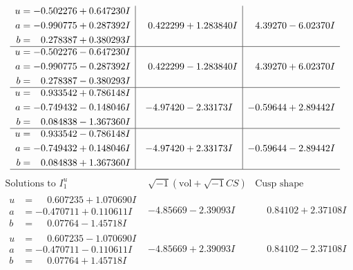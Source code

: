 \documentclass[1p]{elsarticle_modified}
\theoremstyle{definition}
\newcommand{\I}{\sqrt{-1}}
\begin{document}
$$\begin{array}{c|c|c}
\begin{aligned}
u &= -0.502276 + 0.647230 I \\
a &= -0.990775 + 0.287392 I \\
b &= \phantom{-}0.278387 + 0.380293 I\end{aligned}
 & \phantom{-}0.422299 + 1.283840 I & \phantom{-}4.39270 - 6.02370 I \\ \hline\begin{aligned}
u &= -0.502276 - 0.647230 I \\
a &= -0.990775 - 0.287392 I \\
b &= \phantom{-}0.278387 - 0.380293 I\end{aligned}
 & \phantom{-}0.422299 - 1.283840 I & \phantom{-}4.39270 + 6.02370 I \\ \hline\begin{aligned}
u &= \phantom{-}0.933542 + 0.786148 I \\
a &= -0.749432 - 0.148046 I \\
b &= \phantom{-}0.084838 - 1.367360 I\end{aligned}
 & -4.97420 - 2.33173 I & -0.59644 + 2.89442 I \\ \hline\begin{aligned}
u &= \phantom{-}0.933542 - 0.786148 I \\
a &= -0.749432 + 0.148046 I \\
b &= \phantom{-}0.084838 + 1.367360 I\end{aligned}
 & -4.97420 + 2.33173 I & -0.59644 - 2.89442 I\\
 \hline 
 \end{array}$$\newpage$$\begin{array}{c|c|c}  
\text{Solutions to }I^u_{1}& \I (\text{vol} + \sqrt{-1}CS) & \text{Cusp shape}\\
 \hline 
\begin{aligned}
u &= \phantom{-}0.607235 + 1.070690 I \\
a &= -0.470711 + 0.110611 I \\
b &= \phantom{-}0.07764 - 1.45718 I\end{aligned}
 & -4.85669 - 2.39093 I & \phantom{-}0.84102 + 2.37108 I \\ \hline\begin{aligned}
u &= \phantom{-}0.607235 - 1.070690 I \\
a &= -0.470711 - 0.110611 I \\
b &= \phantom{-}0.07764 + 1.45718 I\end{aligned}
 & -4.85669 + 2.39093 I & \phantom{-}0.84102 - 2.37108 I \\ \hline\begin{aligned}

\end{aligned}
\end{array}$$
\end{document}
